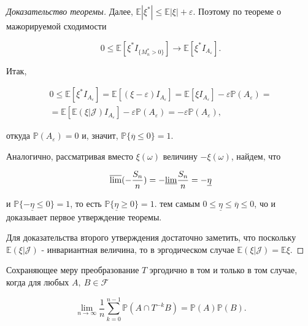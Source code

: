 \begin{proof}[Доказательство теоремы]
Далее, $\mathbb{E}|\xi^*| \leq \mathbb{E}|\xi| + \varepsilon$. Поэтому по теореме о мажорируемой сходимости

{\centering 
$$0 \leq \mathbb{E}[\xi^*I_{\{M_n^* > 0\}}] \rightarrow \mathbb{E}[\xi^*I_{A_{\varepsilon}}].$$
\par}

Итак,

{\centering 
\begin{equation}
	\begin{gathered}
		0 \leq \mathbb{E}[\xi^*I_{A_{\varepsilon}}] = \mathbb{E}[(\xi - \varepsilon)I_{A_{\varepsilon}}] = \mathbb{E}[\xi I_{A_{\varepsilon}}] - \varepsilon\mathbb{P}(A_{\varepsilon}) = \\
		 = \mathbb{E}[\mathbb{E}(\xi|\mathscr{J})I_{A_{\varepsilon}}] - \varepsilon\mathbb{P}(A_{\varepsilon}) = -\varepsilon\mathbb{P}(A_{\varepsilon}),
 	\end{gathered}
\end{equation}
\par}

откуда $\mathbb{P}(A_{\varepsilon}) = 0$ и, значит, $\mathbb{P}\{\overline{\eta} \leq 0\} = 1$.

Аналогично, рассматривая вместо $\xi(\omega)$ величину $-\xi(\omega)$, найдем, что 

{\centering 
$$\overline{\rm lim}(-\frac{S_n}{n}) = -\underline{\rm lim}\frac{S_n}{n} = -\underline{\eta}$$
\par}

и $\mathbb{P}\{-\underline{\eta} \leq 0\} = 1$, то есть $\mathbb{P}\{\underline{\eta} \geq 0\} = 1.$ тем самым $0 \leq \underline{\eta} \leq \overline{\eta} \leq 0$, чо и доказывает первое утверждение теоремы.

Для доказательства второго утверждения достаточно заметить, что поскольку $\mathbb{E}(\xi|\mathscr{J})$ - инвариантная величина, то в эргодическом случае $\mathbb{E}(\xi|\mathscr{J}) = \mathbb{E}\xi$.
\end{proof}

\begin{corollary} Сохраняющее меру преобразование $T$ эргодично в том и только в том случае, когда для любых $A, ~B \in \mathscr{F}$
\end{corollary}

{\centering 
\begin{equation}
\lim_{n\to\infty} \frac{1}{n}\sum_{k=0}^{n-1}\mathbb{P}(A \cap T^{-k}B) = \mathbb{P}(A)\mathbb{P}(B).
\end{equation}
}
